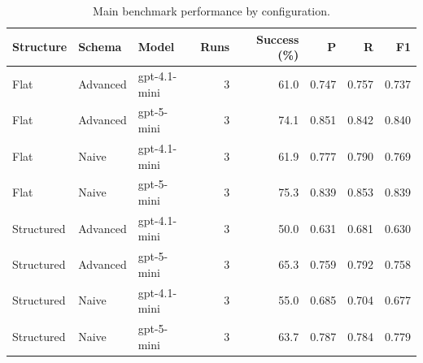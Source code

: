 \begin{table}[htbp]
\centering
\small
\caption{Main benchmark performance by configuration.}
\label{tab:main-config-comparison}
\begin{tabular}{lllrrrrr}
\toprule
Structure & Schema & Model & Runs & Success (\%) & P & R & F1 \\
\midrule
Flat & Advanced & gpt-4.1-mini & 3 & 61.0 & 0.747 & 0.757 & 0.737 \\
Flat & Advanced & gpt-5-mini & 3 & 74.1 & 0.851 & 0.842 & 0.840 \\
Flat & Naive & gpt-4.1-mini & 3 & 61.9 & 0.777 & 0.790 & 0.769 \\
Flat & Naive & gpt-5-mini & 3 & 75.3 & 0.839 & 0.853 & 0.839 \\
Structured & Advanced & gpt-4.1-mini & 3 & 50.0 & 0.631 & 0.681 & 0.630 \\
Structured & Advanced & gpt-5-mini & 3 & 65.3 & 0.759 & 0.792 & 0.758 \\
Structured & Naive & gpt-4.1-mini & 3 & 55.0 & 0.685 & 0.704 & 0.677 \\
Structured & Naive & gpt-5-mini & 3 & 63.7 & 0.787 & 0.784 & 0.779 \\
\bottomrule
\end{tabular}
\end{table}
